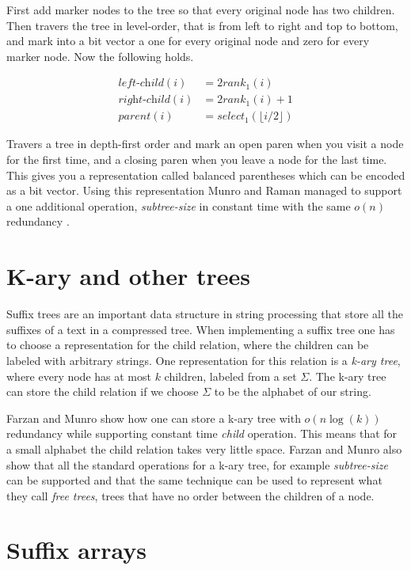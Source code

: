 \documentclass[11pt]{article}
\newcommand{\smallo}{o}
\newcommand{\rank}{\textit{rank}}
\newcommand{\select}{\textit{select}}
\begin{document}
First add marker nodes to the tree so that every original node has two
children. Then travers the tree in level-order, that is from left to
right and top to bottom, and mark into a bit vector a one for every
original node and zero for every marker node. Now the following holds.

\begin{align*}
  \textit{left-child}(i) &= 2\rank_1(i) \\
  \textit{right-child}(i) &= 2\rank_1(i) + 1 \\
  \textit{parent}(i) &= \select_1(\lfloor i / 2 \rfloor )
\end{align*}

Travers a tree in depth-first order and mark an open paren when you
visit a node for the first time, and a closing paren when you leave a
node for the last time. This gives you a representation called
balanced parentheses which can be encoded as a bit vector. Using this
representation Munro and Raman managed to support a one additional
operation, \textit{subtree-size} in constant time with the same
$\smallo(n)$ redundancy \cite{munro01}.

\section{K-ary and other trees}

Suffix trees are an important data structure in string processing that
store all the suffixes of a text in a compressed tree. When
implementing a suffix tree one has to choose a representation for the
child relation, where the children can be labeled with arbitrary
strings. One representation for this relation is a \emph{k-ary tree},
where every node has at most $k$ children, labeled from a set
$\Sigma$. The k-ary tree can store the child relation if we choose
$\Sigma$ to be the alphabet of our string.

Farzan and Munro show \cite{farzan08} how one can store a k-ary tree
with $\smallo(n\log(k))$ redundancy while supporting constant time
\textit{child} operation. This means that for a small alphabet the
child relation takes very little space. Farzan and Munro also show
that all the standard operations for a k-ary tree, for example
\textit{subtree-size} can be supported and that the same technique can
be used to represent what they call \emph{free trees}, trees that have
no order between the children of a node.

\section{Suffix arrays}
\end{document}
